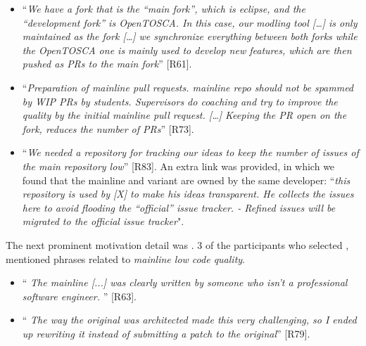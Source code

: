 \begin{itemize}[leftmargin=*]
\item ``\emph{We have a fork that is the ``main fork'', which is eclipse, and the ``development fork'' is OpenTOSCA. In this case, our modling tool [\ldots] is only maintained as the fork [\ldots] we synchronize everything between both forks while the OpenTOSCA one is mainly used to develop new features, which are then pushed as PRs to the main fork}'' [R61].

\item ``\emph{Preparation of mainline pull requests. mainline repo should not be spammed by WIP PRs by students. Supervisors do coaching and try to improve the quality by the initial mainline pull request. [\dots] Keeping the PR open on the fork, reduces the number of PRs}'' [R73].

\item ``\emph{We needed a repository for tracking our ideas to keep the number of issues of the main repository low}'' [R83]. An extra link was provided, in which we found that the mainline and variant are owned by the same developer: ``\emph{this repository is used by [X] to make his ideas transparent. He collects the issues here to avoid flooding the ``official'' issue tracker. - Refined issues will be migrated to the official issue tracker}".
\end{itemize}

\nd The next prominent  motivation detail was .
3 of the participants who selected , mentioned phrases related to \emph{mainline low code quality}.

\begin{itemize}[leftmargin=*]
\item ``\emph{%
The mainline [...] %
was clearly written by someone who isn't a professional software engineer.%
}'' [R63].

\item ``\emph{%
The way the original was architected made this very challenging, so I ended up rewriting it instead of submitting a patch to the original}'' [R79].
\end{itemize}


